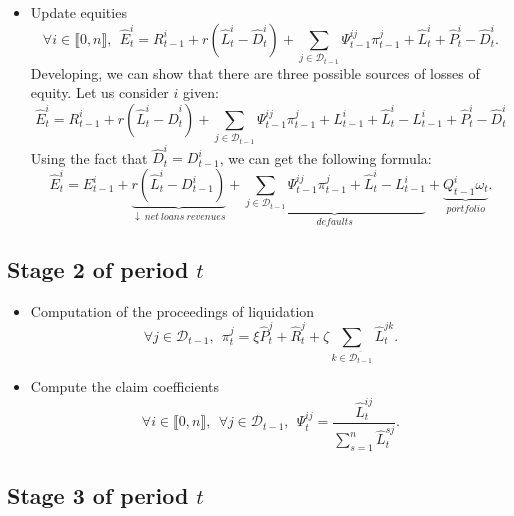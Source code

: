 \documentclass{article}
\newcommand{\wh}{\widehat}
\begin{document}
\begin{itemize}
    \item Update equities
    $$\forall i \in \llbracket 0, n \rrbracket,~~ \wh E^i_t = R_{t-1}^i + r (\wh L_t^i - \wh D_t^i) + \sum_{j \in \mathcal{D}_{t-1}} \Psi_{t-1}^{ij} \pi_{t-1}^j + \wh L^i_t + \wh P_t^i - \wh D^i_t.$$
    Developing, we can show that there are three possible sources of losses of equity. Let us consider $i$ given: 
    $$\wh E^i_t = R_{t-1}^i + r (\wh L_t^i - \wh D_t^i) + \sum_{j \in \mathcal{D}_{t-1}} \Psi_{t-1}^{ij} \pi_{t-1}^j + L_{t-1}^i + \wh L_t^i - L_{t-1}^i + \wh P_t^i - \wh D^i_t$$
    Using the fact that $\wh D_t^i = D_{t-1}^i$, we can get the following formula: 
    $$\wh E^i_t = E^i_{t-1} + \underbrace{r (\wh L_t^i - D_{t-1}^i)}_{\downarrow~net~loans~revenues} + \underbrace{\sum_{j \in \mathcal{D}_{t-1}} \Psi_{t-1}^{ij} \pi_{t-1}^j + \wh L_t^i - L_{t-1}^i}_{defaults} + \underbrace{Q_{t-1}^i\omega_t}_{portfolio}.$$
\end{itemize}


\subsection{Stage 2 of period $t$}
\begin{itemize}
    
    \item Computation of the proceedings of liquidation
    $$ \forall j \in \mathcal{D}_{t-1},~~ \pi_t^j = \xi \widehat{P}_t^j + \widehat{R}_t^j + \zeta \sum_{k \in \overline{\mathcal{D}_{t-1}}} \wh L^{jk}_t.$$ 
        
    \item Compute the claim coefficients
    $$\forall i \in \llbracket 0, n \rrbracket,~~\forall j \in \mathcal{D}_{t-1},~~\Psi_t^{ij} = \frac{ \wh L_t^{ij}}{\sum_{s=1}^n \wh L_t^{sj}}.$$
\end{itemize}


\subsection{Stage 3 of period $t$}
\end{document}
